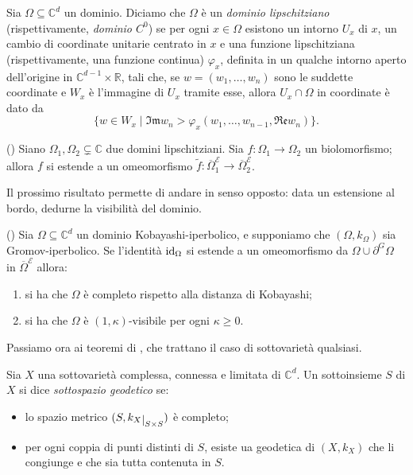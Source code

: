 \begin{defn}
    Sia $\Omega\subseteq\mathbb{C}^d$ un dominio. Diciamo che $\Omega$ è un \textit{dominio lipschitziano} (rispettivamente, \textit{dominio $C^0$}) se per ogni $x\in\Omega$ esistono un intorno $U_x$ di $x$, un cambio di coordinate unitarie centrato in $x$ e una funzione lipschitziana (rispettivamente, una funzione continua) $\varphi_x$, definita in un qualche intorno aperto dell'origine in $\mathbb{C}^{d-1}\times\mathbb{R}$, tali che, se $w=(w_1,\dots,w_n)$ sono le suddette coordinate e $W_x$ è l'immagine di $U_x$ tramite esse, allora $U_x\cap\Omega$ in coordinate è dato da
    $$\{w\in W_x\mid \mathfrak{Im}w_n>\varphi_x(w_1,\dots,w_{n-1},\mathfrak{Re}w_n)\}.$$
\end{defn}

\begin{thm}
    (\cite[Theorem 1.9]{BZ2}) Siano $\Omega_1,\Omega_2\subsetneq\mathbb{C}$ due domini lipschitziani. Sia $f:\Omega_1\longrightarrow\Omega_2$ un biolomorfismo; allora $f$ si estende a un omeomorfismo $\tilde{f}:\overline{\Omega}_1^\mathcal{E}\longrightarrow\overline{\Omega}_2^\mathcal{E}$.
\end{thm}

Il prossimo risultato permette di andare in senso opposto: data un estensione al bordo, dedurne la visibilità del dominio.

\begin{thm}
    (\cite[Theorem 1.10]{BZ2}) Sia $\Omega\subseteq\mathbb{C}^d$ un dominio Kobayashi-iperbolico, e supponiamo che $(\Omega,k_\Omega)$ sia Gromov-iperbolico. Se l'identità $\operatorname{id}_\Omega$ si estende a un omeomorfismo da $\Omega\cup\partial^G\Omega$ in $\overline{\Omega}^\mathcal{E}$ allora:
    \begin{enumerate}[label={(\arabic*)}]
        \item si ha che $\Omega$ è completo rispetto alla distanza di Kobayashi;
        \item si ha che $\Omega$ è $(1,\kappa)$-visibile per ogni $\kappa\ge0$.
    \end{enumerate}
\end{thm}

Passiamo ora ai teoremi di \cite{CMS}, che trattano il caso di sottovarietà qualsiasi.

\begin{defn}
    Sia $X$ una sottovarietà complessa, connessa e limitata di $\mathbb{C}^d$. Un sottoinsieme $S$ di $X$ si dice \textit{sottospazio geodetico} se:
    \begin{itemize}
        \item lo spazio metrico $(S,k_X\restrict{S\times S})$ è completo;
        \item per ogni coppia di punti distinti di $S$, esiste ua geodetica di $(X,k_X)$ che li congiunge e che sia tutta contenuta in $S$.
    \end{itemize}
\end{defn}

